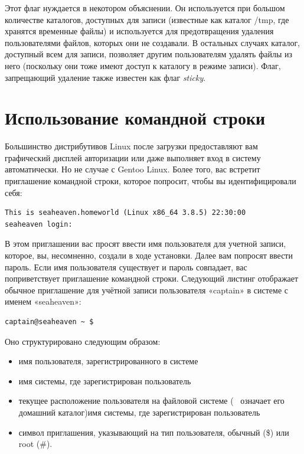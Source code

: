 \documentclass[10pt]{book}
\begin{document}
Этот флаг нуждается в некотором объяснении.  Он используется при большом количестве каталогов, доступных для записи (известные как каталог /tmp, где хранятся временные файлы) и используется для предотвращения удаления пользователями файлов, которых они не создавали. В остальных случаях каталог, доступный всем для записи, позволяет другим пользователям удалять файлы из него (поскольку они тоже имеют доступ к каталогу в режиме записи). Флаг, запрещающий удаление также известен как флаг \emph{sticky}.

\section{Использование командной строки}

Большинство дистрибутивов Linux после загрузки предоставляют вам графический дисплей авторизации или даже выполняет вход в систему автоматически. Но не случае с Gentoo Linux. Более того, вас встретит приглашение командной строки, которое попросит, чтобы вы идентифицировали себя:

\vspace{3mm}
\begin{tcolorbox}
\begin{lstlisting}
This is seaheaven.homeworld (Linux x86_64 3.8.5) 22:30:00
seaheaven login:
\end{lstlisting}
\end{tcolorbox}

В этом приглашении вас просят ввести  имя пользователя для учетной записи, которое, вы, несомненно, создали  в ходе установки. Далее вам попросят ввести пароль. Если имя пользователя существует и пароль совпадает, вас поприветствует приглашение командной строки. Следующий листинг отображает обычное приглашение для учётной записи пользователя «captain» в системе с именем «seaheaven»:

\vspace{3mm}
\begin{tcolorbox}
\begin{lstlisting}
captain@seaheaven ~ $
\end{lstlisting}
\end{tcolorbox}

Оно структурировано следующим образом:

\begin{itemize}
	\item имя пользователя, зарегистрированного в системе
	\item имя системы, где зарегистрирован пользователь
	\item текущее расположение пользователя на файловой системе (~ означает его домашний каталог)имя системы, где зарегистрирован пользователь
	\item символ приглашения, указывающий на тип пользователя, обычный (\$) или root (\#).
\end{itemize}
\end{document}
